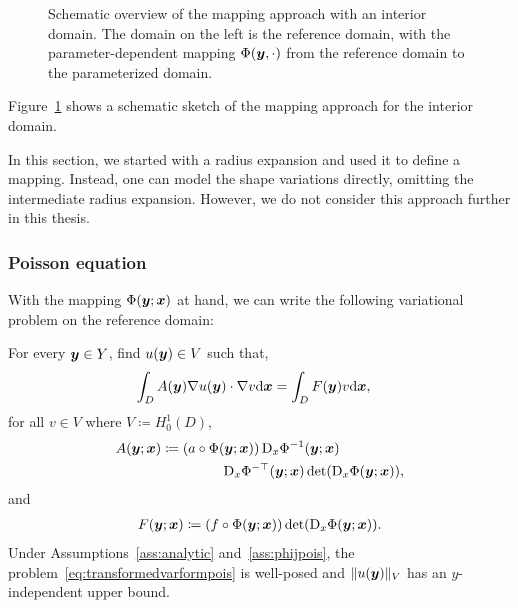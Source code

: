 \begin{figure}
    \centering
    \caption{Schematic overview of the mapping approach with an interior domain. The domain on the left is the reference domain, with the parameter-dependent mapping $\Phi({\bm{y}}, \cdot)$ from the reference domain to the parameterized domain.}
    \label{fig:mappingappraochtikz}
\end{figure}
Figure~\ref{fig:mappingappraochtikz} shows a schematic sketch of the mapping approach for the interior domain.

In this section, we started with a radius expansion and used it to define a mapping.
Instead, one can model the shape variations directly, omitting the intermediate radius expansion.
However, we do not consider this approach further in this thesis.

\subsubsection{Poisson equation}\label{subsubsec:poisson-mapping}
With the mapping $\Phi({\bm{y}}; {{\bm{x}}})$ at hand, we can write the following variational problem on the reference domain:

For every ${\bm{y}}\in Y$, find $u({\bm{y}}) \in V$ such that,
\begin{align}
    &\int_{{D}} {A}({\bm{y}}) {\nabla} {u}({\bm{y}}) \cdot  {\nabla} {v} \mathrm{d}{{\bm{x}}} = \int_{{D}} F({\bm{y}}) {v} \mathrm{d}{{\bm{x}}}, \label{eq:transformedvarformpois}
\end{align}
for all $v \in V$ where $V\coloneqq H_0^1(D)$,
\begin{align}
{A}({\bm{y}}; {{\bm{x}}}) \coloneqq (a\circ\Phi({\bm{y}}; {{\bm{x}}})) \mathop{}\!\mathrm{D}_x\Phi^{-1}&({\bm{y}}; {{\bm{x}}}) \nonumber\\\mathop{}\!\mathrm{D}_x\Phi^{-\top}({\bm{y}}; {{\bm{x}}})
&\det(\mathop{}\!\mathrm{D}_x\Phi({\bm{y}}; {{\bm{x}}})), \label{eq:hatAdefpois}
\end{align}
and
\begin{align}
    F({\bm{y}}; {{\bm{x}}}) \coloneqq (f\circ\Phi({\bm{y}}; {{\bm{x}}})) \det(\mathop{}\!\mathrm{D}_x\Phi({\bm{y}}; {{\bm{x}}})).\label{eq:hatfdefpois}
\end{align}
Under Assumptions~\ref{ass:analytic} and~\ref{ass:phijpois}, the problem~\eqref{eq:transformedvarformpois} is well-posed and $\|u({\bm{y}})\|_{V}$ has an $y$-independent upper bound.

